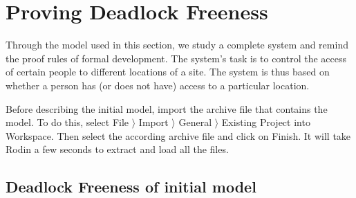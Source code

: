 \clearpage
\section{Proving Deadlock Freeness}
\label{tut_location_access_controller}




Through the model used in this section, we study a complete system and remind the proof rules of formal development. The system's task is to control the access of certain people to different locations of a site. The system is thus based on whether a person has (or does not have) access to a particular location.

Before describing the initial model, import the archive file  that contains the model. To do this, select  \textsf{File $\rangle$ Import $\rangle$ General $\rangle$ Existing Project into Workspace}. Then select the according archive file and click on \textsf{Finish}. It will take Rodin a few seconds to extract and load all the files.

\subsection{Deadlock Freeness of initial model}
\label{deadlock}
\label{tut_initial_model}


 
